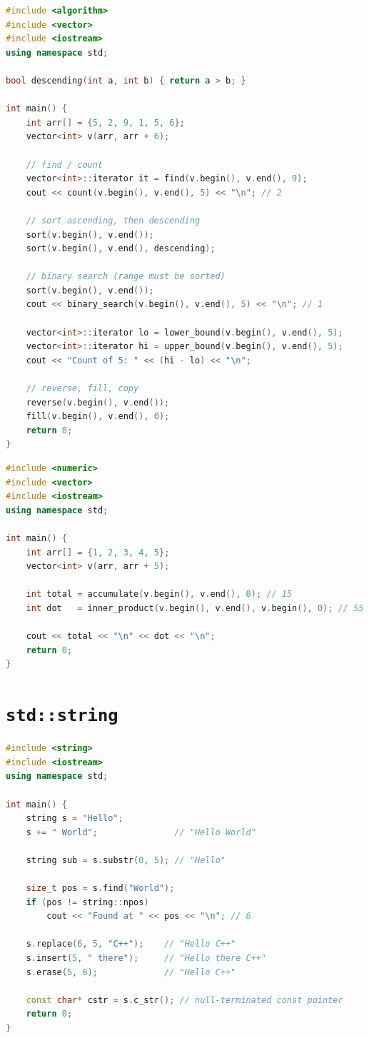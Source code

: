 \begin{lstlisting}[language=C++, caption={Non-modifying, modifying, and sorting algorithms}]
#include <algorithm>
#include <vector>
#include <iostream>
using namespace std;

bool descending(int a, int b) { return a > b; }

int main() {
    int arr[] = {5, 2, 9, 1, 5, 6};
    vector<int> v(arr, arr + 6);

    // find / count
    vector<int>::iterator it = find(v.begin(), v.end(), 9);
    cout << count(v.begin(), v.end(), 5) << "\n"; // 2

    // sort ascending, then descending
    sort(v.begin(), v.end());
    sort(v.begin(), v.end(), descending);

    // binary search (range must be sorted)
    sort(v.begin(), v.end());
    cout << binary_search(v.begin(), v.end(), 5) << "\n"; // 1

    vector<int>::iterator lo = lower_bound(v.begin(), v.end(), 5);
    vector<int>::iterator hi = upper_bound(v.begin(), v.end(), 5);
    cout << "Count of 5: " << (hi - lo) << "\n";

    // reverse, fill, copy
    reverse(v.begin(), v.end());
    fill(v.begin(), v.end(), 0);
    return 0;
}
\end{lstlisting}

\begin{lstlisting}[language=C++, caption={Numeric algorithms}]
#include <numeric>
#include <vector>
#include <iostream>
using namespace std;

int main() {
    int arr[] = {1, 2, 3, 4, 5};
    vector<int> v(arr, arr + 5);

    int total = accumulate(v.begin(), v.end(), 0); // 15
    int dot   = inner_product(v.begin(), v.end(), v.begin(), 0); // 55

    cout << total << "\n" << dot << "\n";
    return 0;
}
\end{lstlisting}

\section{\texttt{std::string}}
\label{sec:string}

\begin{lstlisting}[language=C++, caption={std::string fundamentals}]
#include <string>
#include <iostream>
using namespace std;

int main() {
    string s = "Hello";
    s += " World";               // "Hello World"

    string sub = s.substr(0, 5); // "Hello"

    size_t pos = s.find("World");
    if (pos != string::npos)
        cout << "Found at " << pos << "\n"; // 6

    s.replace(6, 5, "C++");    // "Hello C++"
    s.insert(5, " there");     // "Hello there C++"
    s.erase(5, 6);             // "Hello C++"

    const char* cstr = s.c_str(); // null-terminated const pointer
    return 0;
}
\end{lstlisting}

